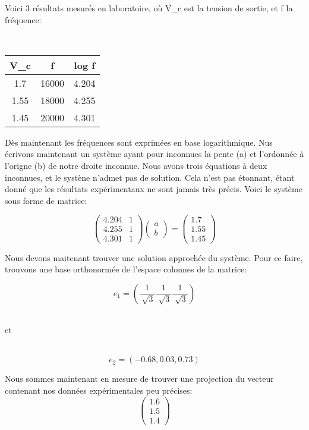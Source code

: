 \documentclass{article}
\begin{document}
Voici 3 résultats mesurés en laboratoire, où V_c est la tension de sortie, et f la fréquence:

\bigbreak
\\
\begin{tabular}{|c|c|c|}
\hline
V_c & f & log{ f} \\
\hline
1.7 & 16000 & 4.204\\
\hline
1.55 & 18000 & 4.255\\
\hline
1.45 & 20000 & 4.301 \\
\hline
\end{tabular}

\bigbreak
Dès maintenant les fréquences sont exprimées en base logarithmique.
Nus écrivons maintenant un système ayant pour inconnues la pente (a) et l'ordonnée à l'origne (b) de notre droite inconnue. Nous avons trois équations à deux inconnues, et le systène n'admet pas de solution. Cela n'est pas étonnant, étant donné que les résultats expérimentaux ne sont jamais très précis.
Voici le système sous forme de matrice:
\bigbreak

$$
\begin{pmatrix}  
 4.204 & 1\\
 4.255 & 1 \\
 4.301 & 1 
\end{pmatrix}
\begin{pmatrix}  
a\\
b
\end{pmatrix}
=
\begin{pmatrix}  
1.7\\
1.55\\
1.45
\end{pmatrix}
$$

\bigbreak
Nous devons maitenant trouver une solution approchée du système. Pour ce faire, trouvons une base orthonormée de l'espace colonnes de la matrice:

\[e_1=( \frac{1}{\sqrt[]{3}} \frac{1}{\sqrt[]{3}} \frac{1}{\sqrt[]{3}})\]

\\ et

\\
\[e_2=( -0.68, 0.03, 0.73)\]

\bigbreak
Nous sommes maintenant en mesure de trouver une projection du vecteur contenant nos données expérimentales peu précises:
$$
\begin{pmatrix}  
1.6\\
1.5\\
1.4
\end{pmatrix}$$
$$
\end{document}
